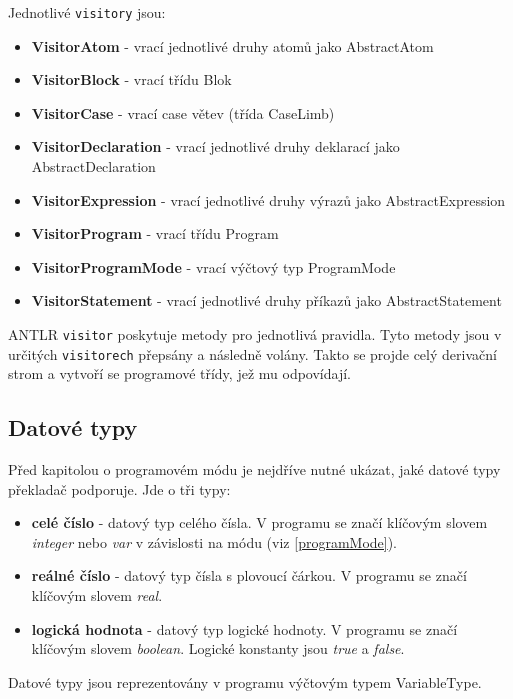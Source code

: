 \documentclass[
12pt,
a4paper,
pdftex,
czech,
titlepage
]{report}
\begin{document}
	 Jednotlivé \texttt{visitory} jsou:
	 
	 \begin{itemize}
	 \item \textbf{VisitorAtom} - vrací jednotlivé druhy atomů jako AbstractAtom
	 \item \textbf{VisitorBlock} - vrací třídu Blok
	 \item \textbf{VisitorCase} - vrací case větev (třída CaseLimb)
	 \item \textbf{VisitorDeclaration} - vrací jednotlivé druhy deklarací jako AbstractDeclaration
	 \item \textbf{VisitorExpression} - vrací jednotlivé druhy výrazů jako AbstractExpression
	 \item \textbf{VisitorProgram} - vrací třídu Program
	 \item \textbf{VisitorProgramMode} - vrací výčtový typ ProgramMode
	 \item \textbf{VisitorStatement} - vrací jednotlivé druhy příkazů jako AbstractStatement
	 \end{itemize} 
	 
ANTLR \texttt{visitor} poskytuje metody pro jednotlivá pravidla. Tyto metody jsou v určitých \texttt{visitorech} přepsány a následně volány. Takto se projde celý derivační strom a vytvoří se programové třídy, jež mu odpovídají.	
 
 \subsection{Datové typy}
Před kapitolou o programovém módu je nejdříve nutné ukázat, jaké datové typy překladač podporuje. Jde o tři typy:
\begin{itemize}
\item \textbf{celé číslo} - datový typ celého čísla. V programu se značí klíčovým slovem \textit{integer} nebo \textit{var} v závislosti na módu (viz \ref{programMode}). 
\item \textbf{reálné číslo} - datový typ čísla s plovoucí čárkou. V programu se značí klíčovým slovem \textit{real}.
\item \textbf{logická hodnota} - datový typ logické hodnoty. V programu se značí klíčovým slovem \textit{boolean}. Logické konstanty jsou \textit{true} a \textit{false}. 
\end{itemize} 

Datové typy jsou reprezentovány v programu výčtovým typem VariableType.
 
\end{document}
